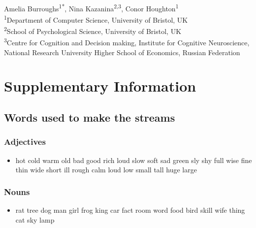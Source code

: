 \documentclass[10pt,letterpaper]{article}
\begin{document}
\begin{flushleft}
{\Large
\textbf{} 
}
\newline
\\
Amelia Burroughs\textsuperscript{1*},
Nina Kazanina\textsuperscript{2,3},
Conor Houghton\textsuperscript{1}
\\
\bigskip
\textsuperscript{1}Department of Computer Science, University of Bristol, UK\\
\textsuperscript{2}School of Psychological Science, University of Bristol, UK\\
\textsuperscript{3}Centre for Cognition and Decision making, Institute for Cognitive Neuroscience, National Research University Higher School of Economics, Russian Federation

\end{flushleft}
\pagebreak{}


\section*{Supplementary Information}


\subsection*{Words used to make the streams}

\subsubsection*{Adjectives}
\begin{itemize}
  \item hot cold warm old bad good rich loud slow soft sad green sly
    shy full wise fine thin wide short ill rough calm loud low small
    tall huge large
\end{itemize}

\subsubsection*{Nouns}
\begin{itemize}
  \item rat tree dog man girl frog king car fact room word food bird
    skill wife thing cat sky lamp
\end{itemize}
\end{document}
